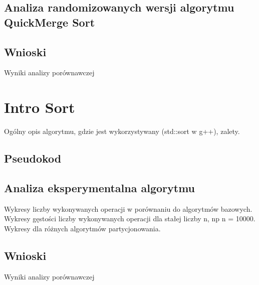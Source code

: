 \begin{figure}[]
	\centering
	
	\caption[]{}
	\label{fig:quick-merge-sort-deterministic-pivot-random}
\end{figure}

\subsection{Analiza randomizowanych wersji algorytmu QuickMerge Sort}

\begin{figure}[]
	\centering
	
	\caption[]{}
	\label{fig:quick-merge-sort-nondeterministic-pivot-random}
\end{figure}

\subsection{Wnioski}
Wyniki analizy porównawczej


\section{Intro Sort}
Ogólny opis algorytmu, gdzie jest wykorzystywany (std::sort w g++), zalety.
\subsection{Pseudokod}

\subsection{Analiza eksperymentalna algorytmu}
Wykresy liczby wykonywanych operacji w porównaniu do algorytmów bazowych.
Wykresy gęstości liczby wykonywanych operacji dla stałej liczby n, np n = 10000.
Wykresy dla różnych algorytmów partycjonowania.

\subsection{Wnioski}
Wyniki analizy porównawczej




